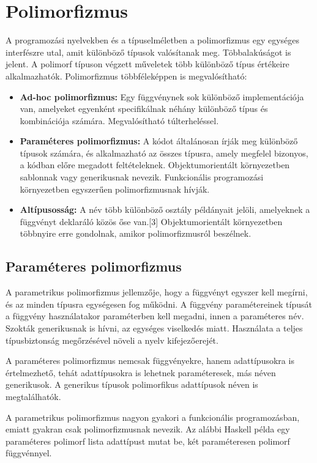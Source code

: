 \documentclass[margin=0px]{article}
\begin{document}
\section{Polimorfizmus}
A programozási nyelvekben és a típuselméletben a polimorfizmus egy egységes interfészre utal, amit különböző típusok valósítanak meg. Többalakúságot is jelent. A polimorf típuson végzett műveletek több különböző típus értékeire alkalmazhatók. Polimorfizmus többféleképpen is megvalósítható:
\begin{itemize}
    \item {\textbf {Ad-hoc polimorfizmus:}} Egy függvénynek sok különböző implementációja van, amelyeket egyenként specifikálnak néhány különböző típus és kombinációja számára. Megvalósítható túlterheléssel.
    \item {\textbf {Paraméteres polimorfizmus:}} A kódot általánosan írják meg különböző típusok számára, és alkalmazható az összes típusra, amely megfelel bizonyos, a kódban előre megadott feltételeknek. Objektumorientált környezetben sablonnak vagy generikusnak nevezik. Funkcionális programozási környezetben egyszerűen polimorfizmusnak hívják.
    \item {\textbf {Altípusosság:}} A név több különböző osztály példányait jelöli, amelyeknek a függvényt deklaráló közös őse van.[3] Objektumorientált környezetben többnyire erre gondolnak, amikor polimorfizmusról beszélnek.
\end{itemize}

\subsection{Paraméteres polimorfizmus}
A parametrikus polimorfizmus jellemzője, hogy a függvényt egyszer kell megírni, és az minden típusra egységesen fog működni. A függvény paramétereinek típusát a függvény használatakor paraméterben kell megadni, innen a paraméteres név. Szokták generikusnak is hívni, az egységes viselkedés miatt. Használata a teljes típusbiztonság megőrzésével növeli a nyelv kifejezőerejét.

A paraméteres polimorfizmus nemcsak függvényekre, hanem adattípusokra is értelmezhető, tehát adattípusokra is lehetnek paraméteresek, más néven generikusok. A generikus típusok polimorfikus adattípusok néven is megtalálhatók.

A parametrikus polimorfizmus nagyon gyakori a funkcionális programozásban, emiatt gyakran csak polimorfizmusnak nevezik. Az alábbi Haskell példa egy paraméteres polimorf lista adattípust mutat be, két paraméteresen polimorf függvénnyel.
\end{document}
